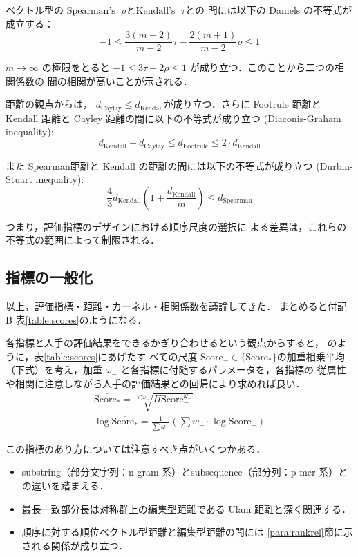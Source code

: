\documentclass[japanese]{jnlp_1.4}
\begin{document}
ベクトル型の $\mbox{Spearman's }\; \rho$と$\mbox{Kendall's }\; \tau$との
      間には以下の Daniels の不等式が成立する：
\[
-1 \leq \frac{3(m+2)}{m-2} \tau - \frac{2(m+1)}{m-2}\rho \leq 1
\]

$m\rightarrow \infty$ の極限をとると
$-1 \leq 3 \tau - 2 \rho \leq 1$ が成り立つ．このことから二つの相関係数の
間の相関が高いことが示される．

距離の観点からは，
$d_{\mbox{Caylay}} \leq d_{\mbox{Kendall}}$が成り立つ．さらに Footrule
距離と Kendall 距離と Cayley 距離の間に以下の不等式が成り立つ
(Diaconis-Graham inequality):
\[
 d_{\mbox{Kendall}} + d_{\mbox{Caylay}} \leq d_{\mbox{Footrule}} \leq 2
      \cdot d_{\mbox{Kendall}}
\]

また Spearman距離と Kendall の距離の間には以下の不等式が成り立つ
(Durbin-Stuart inequality):
\[
 \frac{4}{3} d_{\mbox{Kendall}} (1 + \frac{d_{\mbox{Kendall}}}{m}) \leq d_{\mbox{Spearman}}
\]

つまり，評価指標のデザインにおける順序尺度の選択に
よる差異は，これらの不等式の範囲によって制限される．


\subsection{指標の一般化}
\label{ss:sim-general}

以上，評価指標・距離・カーネル・相関係数を議論してきた．
まとめると付記 B 表\ref{table:scores}のようになる．

各指標と人手の評価結果をできるかぎり合わせるという観点からすると，
\cite{hirao-2007-JSAI-journal} のように，表\ref{table:scores}にあげたす
べての尺度 $\mbox{Score}_{-} \in \{\mbox{Score}_{*}\}$の加重相乗平均
（下式）を考え，加重 $\omega_{-}$ と各指標に付随するパラメータを，各指標の
従属性や相関に注意しながら人手の評価結果との回帰により求めれば良い．
\begin{gather*}
\overline{\mbox{Score}_{*}} = \sqrt[\displaystyle \sum \omega_{-}]{\displaystyle \Pi \mbox{Score}^{\omega_{-}}_{-}} \\
\log \overline{\mbox{Score}_{*}} = \frac{1}{\displaystyle \sum \omega_{-}} ( \sum w_{-} \cdot \log \mbox{Score}_{-})
\end{gather*}

この指標のあり方については注意すべき点がいくつかある．
\begin{itemize}
 \item substring（部分文字列：n-gram 系）とsubsequence（部分列：p-mer 系）との違いを踏まえる．
 \item 最長一致部分長は対称群上の編集型距離である Ulam 距離と深く関連する．
 \item 順序に対する順位ベクトル型距離と編集型距離の間には
       \ref{para:rankrel}節に示される関係が成り立つ．
\end{itemize}
\end{document}
